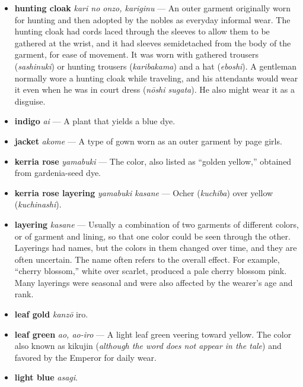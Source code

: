 \documentclass{article}
\begin{document}
\begin{multicols}{3}
\begin{footnotesize}
\begin{itemize}[
			label=,
			leftmargin=0em,
			rightmargin=-1.5em,
			itemindent=-2em,
			nosep,
		]
		\item \textbf{hunting cloak} \textit{kari no onzo, kariginu} --- An outer garment originally worn for hunting and then adopted by the nobles as everyday informal wear. The hunting cloak had cords laced through the sleeves to allow them to be gathered at the wrist, and it had sleeves semidetached from the body of the garment, for ease of movement. It was worn with gathered trousers (\textit{sashinuki}) or hunting trousers (\textit{karibakama}) and a hat (\textit{eboshi}). A gentleman normally wore a hunting cloak while traveling, and his attendants would wear it even when he was in court dress (\textit{nōshi sugata}). He also might wear it as a disguise.

		\item \textbf{indigo} \textit{ai} --- A plant that yields a blue dye.

		\item \textbf{jacket} \textit{akome} --- A type of gown worn as an outer garment by page girls.

		\item \textbf{kerria rose} \textit{yamabuki} --- The color, also listed as “golden yellow,” obtained from gardenia-seed dye.

		\item \textbf{kerria rose layering} \textit{yamabuki kasane} --- Ocher (\textit{kuchiba}) over yellow (\textit{kuchinashi}).

		\item \textbf{layering} \textit{kasane} --- Usually a combination of two garments of different colors, or of garment and lining, so that one color could be seen through the other. Layerings had names, but the colors in them changed over time, and they are often uncertain. The name often refers to the overall effect. For example, “cherry blossom,” white over scarlet, produced a pale cherry blossom pink. Many layerings were seasonal and were also affected by the wearer's age and rank.

		\item \textbf{leaf gold} \textit{kanzō} iro.

		\item \textbf{leaf green} \textit{ao, ao-iro} --- A light leaf green veering toward yellow. The color also known as kikujin (\textit{although the word does not appear in the tale}) and favored by the Emperor for daily wear.

		\item \textbf{light blue} \textit{asagi}.


\end{itemize}
\end{footnotesize}
\end{multicols}
\end{document}
